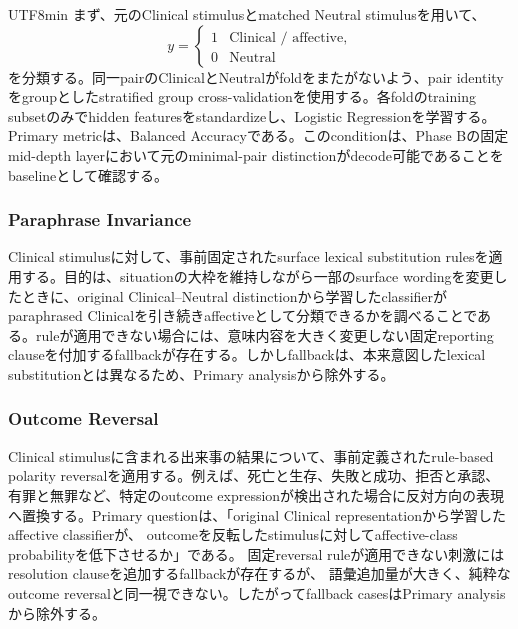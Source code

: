 \documentclass{article} %
\begin{document}
\begin{CJK*}{UTF8}{min}
まず、元のClinical stimulusとmatched Neutral stimulusを用いて、
\[
y
=
\begin{cases}
1 & \text{Clinical / affective},\\
0 & \text{Neutral}
\end{cases}
\]
を分類する。同一pairのClinicalとNeutralがfoldをまたがないよう、pair identityをgroupとしたstratified group cross-validationを使用する。各foldのtraining subsetのみでhidden featuresをstandardizeし、Logistic Regressionを学習する。Primary metricは、Balanced Accuracyである。このconditionは、Phase Bの固定mid-depth layerにおいて元のminimal-pair distinctionがdecode可能であることをbaselineとして確認する。


\subsubsection{Paraphrase Invariance}

Clinical stimulusに対して、事前固定されたsurface lexical substitution rulesを適用する。目的は、situationの大枠を維持しながら一部のsurface wordingを変更したときに、original Clinical--Neutral distinctionから学習したclassifierがparaphrased Clinicalを引き続きaffectiveとして分類できるかを調べることである。ruleが適用できない場合には、意味内容を大きく変更しない固定reporting clauseを付加するfallbackが存在する。しかしfallbackは、本来意図したlexical substitutionとは異なるため、Primary analysisから除外する。



\subsubsection{Outcome Reversal}

Clinical stimulusに含まれる出来事の結果について、事前定義されたrule-based polarity reversalを適用する。例えば、死亡と生存、失敗と成功、拒否と承認、有罪と無罪など、特定のoutcome expressionが検出された場合に反対方向の表現へ置換する。Primary questionは、「original Clinical representationから学習したaffective classifierが、
outcomeを反転したstimulusに対してaffective-class probabilityを低下させるか」である。
固定reversal ruleが適用できない刺激にはresolution clauseを追加するfallbackが存在するが、
語彙追加量が大きく、純粋なoutcome reversalと同一視できない。したがってfallback casesはPrimary analysisから除外する。



\end{CJK*}
\end{document}
